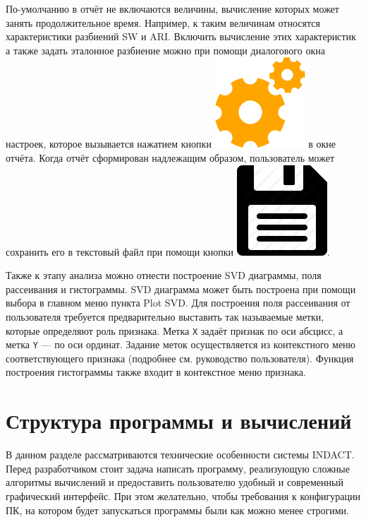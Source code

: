\documentclass[12pt]{diploma}
\begin{document}
	По-умолчанию в отчёт не включаются величины, вычисление которых может занять продолжительное время. Например, к таким величинам относятся характеристики разбиений SW и ARI. Включить вычисление этих характеристик а также задать эталонное разбиение можно при помощи диалогового окна настроек, которое вызывается нажатием кнопки \includegraphics[scale=0.1]{img/settings} в окне отчёта. Когда отчёт сформирован надлежащим образом, пользователь может сохранить его в текстовый файл при помощи кнопки \includegraphics[scale=0.1]{img/save}.
	
	Также к этапу анализа можно отнести построение SVD диаграммы, поля рассеивания и гистограммы. SVD диаграмма может быть построена при помощи выбора в главном меню пункта Plot \textrightarrow SVD. Для построения поля рассеивания от пользователя требуется предварительно выставить так называемые метки, которые определяют роль признака. Метка \texttt{X} задаёт признак по оси абсцисс, а метка \texttt{Y} --- по оси ординат. Задание меток осуществляется из контекстного меню соответствующего признака (подробнее см. руководство пользователя). Функция построения гистограммы также входит в контекстное меню признака.
	
	\section{Структура программы и вычислений} \label{sec:structure}
	
	В данном разделе рассматриваются технические особенности системы INDACT. Перед разработчиком стоит задача написать программу, реализующую сложные алгоритмы вычислений и предоставить пользователю удобный и современный графический интерфейс. При этом желательно, чтобы требования к конфигурации ПК, на котором будет запускаться программы были как можно менее строгими. 
	
\end{document}
